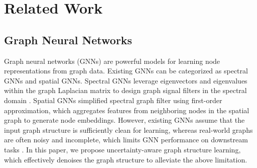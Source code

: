 \section{Related Work}
\label{sec5}
\subsection{Graph Neural Networks}
Graph neural networks (GNNs) are powerful models for learning node representations from graph data.
Existing GNNs can be categorized as spectral GNNs and spatial GNNs.
Spectral GNNs leverage eigenvectors and eigenvalues within the graph Laplacian matrix to design graph signal filters in the spectral domain \cite{bruna2013spectral,defferrard2016convolutional,li2021dimensionwise,he2022convolutional}.
Spatial GNNs \cite{kipf2017semisupervised,gilmer2017neural,veličković2018graph,wu2019simplifying,ding2022sketch,wu2021disenkgat} simplified spectral graph filter \cite{defferrard2016convolutional} using first-order approximation, which aggregates features from neighboring nodes in the spatial graph to generate node embeddings.
However, existing GNNs assume that the input graph structure is sufficiently clean for learning, whereas real-world graphs are often noisy and incomplete, which limits GNN performance on downstream tasks \cite{geisler2021robustness,chen2023bias}.
In this paper, we propose uncertainty-aware graph structure learning, which effectively denoises the graph structure to alleviate the above limitation.





